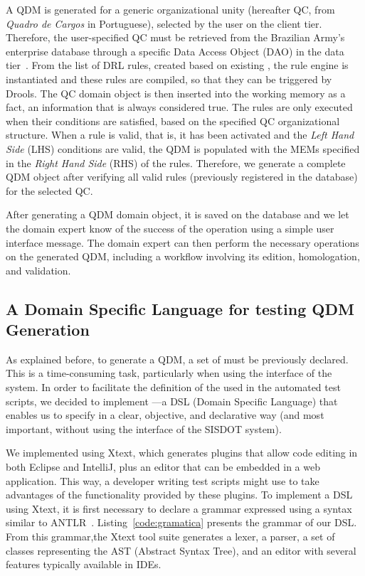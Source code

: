 A QDM is generated for a generic organizational unity (hereafter QC, from \emph{Quadro de Cargos} in Portuguese), 
selected by the user on the client tier. 
Therefore, the user-specified QC must be retrieved from the Brazilian Army's enterprise database  
through a specific Data Access Object (DAO) in the data tier~\cite{alur2003}.
From the list of DRL rules, created based on existing \callers, the rule engine is instantiated and these rules are compiled, 
so that they can be triggered by Drools. The QC domain object is then inserted into the working memory as a fact,  an 
information that is always considered true. The rules are only executed when their conditions are satisfied, 
based on the specified QC organizational structure. When a rule is valid, that is, it has been activated 
and the \emph{Left Hand Side} (LHS) conditions are valid, 
the QDM is populated with the MEMs specified in the \emph{Right Hand Side} (RHS) of the rules. Therefore, we generate a 
complete QDM object after verifying all valid rules (previously registered in the database) for 
the selected QC. 

After generating a QDM domain object, it is saved on the database and we let the domain expert know 
of the success of the operation using a simple user interface message. 
The domain expert can then perform the necessary operations on the generated QDM, including a workflow 
involving  its edition, homologation, and validation.  

\subsection{A Domain Specific Language for testing QDM Generation}

As explained before, to generate a QDM, a set of \callers must be previously 
declared. This is a time-consuming task, particularly when using the interface of 
the system. In order to facilitate the definition of the \callers used in the automated test scripts, we 
decided to implement \hlrdsl---a DSL (Domain Specific Language) that enables us to specify \callers in a 
clear, objective, and declarative way (and most important, without using the interface of the SISDOT system). 

We implemented \hlrdsl  using Xtext, which generates plugins that allow
code editing in both Eclipse and IntelliJ, plus an editor that can be
embedded in a web application. This way, a developer writing test scripts might
use \hlrdsl to take advantages of the functionality provided by these plugins.
To implement a DSL using Xtext, it is first necessary to declare a grammar expressed
using a syntax similar to ANTLR~\cite{parr2013}. Listing~\ref{code:gramatica} presents
the grammar of our DSL. From this grammar,the Xtext tool suite generates a lexer, a parser, a
set of classes representing the AST (Abstract Syntax Tree), and an editor with several features
typically available in IDEs.

